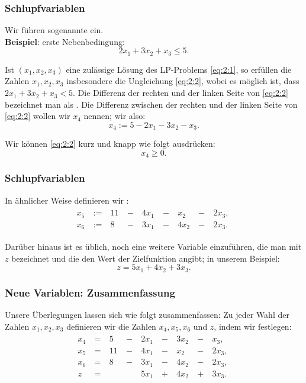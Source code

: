 \documentclass[smaller]{beamer}
\begin{document}
\begin{frame}
 \frametitle{Schlupfvariablen}
 Wir führen sogenannte  ein. \\
 \vspace*{0.2cm}
 \textbf{Beispiel}: erste Nebenbedingung:
\begin{equation}
\label{eq:2:2}
2x_1 + 3x_2 + x_3 \leq 5.
\end{equation}

Ist $(x_1,x_2,x_3)$ eine zulässige Lösung des LP-Problems \eqref{eq:2:1}, so erfüllen die Zahlen $x_1, x_2, x_3$ insbesondere die Ungleichung \eqref{eq:2:2}, wobei es möglich ist, dass $2x_1+3x_2+x_3 < 5$. Die Differenz der rechten und der linken Seite von \eqref{eq:2:2} bezeichnet man als . Die Differenz zwischen der rechten und der linken Seite von \eqref{eq:2:2} wollen wir $x_4$ nennen; wir  also:
\[
x_4 := 5 - 2x_1 - 3x_2 - x_3.
\]

Wir können \eqref{eq:2:2} kurz und knapp wie folgt ausdrücken:
\[
x_4 \geq 0.
\]
\end{frame}

\begin{frame}
\frametitle{Schlupfvariablen} 
In ähnlicher Weise definieren wir :
\begin{align*}
\begin{alignedat}{5}
x_5 &\ := &\ 11 &\ - &\ 4x_1 &\ - &\  x_2 &\ - &\ 2x_3,\ \\
x_6 &\ := &\  8 &\ - &\ 3x_1 &\ - &\ 4x_2 &\ - &\ 2x_3.\
\end{alignedat}
\end{align*}

Darüber hinaus ist es üblich, noch eine weitere Variable einzuführen, die man mit $z$ bezeichnet und die den Wert der Zielfunktion angibt; in unserem Beispiel:
\[
z = 5x_1 + 4x_2 + 3x_3.
\]
\end{frame}

\begin{frame}
 \frametitle{Neue Variablen: Zusammenfassung}
 Unsere Überlegungen lassen sich wie folgt zusammenfassen: Zu jeder Wahl der Zahlen $x_1,x_2,x_3$ definieren wir die Zahlen $x_4,x_5,x_6$ und $z$, indem wir festlegen:
\begin{align}
\begin{alignedat}{5}
\label{eq:2:3}
x_4 &\ = &\  5 &\ - &\ 2x_1 &\ - &\ 3x_2 &\ - &\  x_3,\ \\
x_5 &\ = &\ 11 &\ - &\ 4x_1 &\ - &\  x_2 &\ - &\ 2x_3,\ \\
x_6 &\ = &\  8 &\ - &\ 3x_1 &\ - &\ 4x_2 &\ - &\ 2x_3,\ \\
z   &\ = &     &    &\ 5x_1 &\ + &\ 4x_2 &\ + &\ 3x_3.\
\end{alignedat}
\end{align}
\end{frame}
\end{document}
